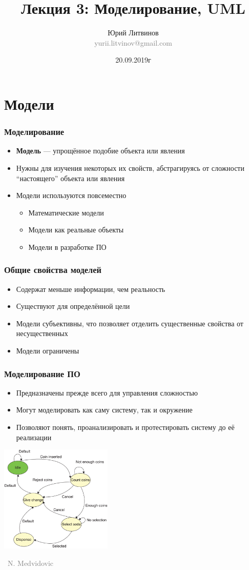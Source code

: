\documentclass[xetex,mathserif,serif]{beamer}
\title[Моделирование]{Лекция 3: Моделирование, UML}
\author[Юрий Литвинов]{Юрий Литвинов\\\small{\textcolor{gray}{yurii.litvinov@gmail.com}}}
\date{20.09.2019г}
\newcommand{\attribution}[1] {
	\vspace{-5mm}\begin{flushright}\begin{scriptsize}\textcolor{gray}{\textcopyright\, #1}\end{scriptsize}\end{flushright}
}
\begin{document}
	\frame{\titlepage}

	\section{Модели}

	\begin{frame}
		\frametitle{Моделирование}
		\begin{itemize}
			\item \textbf{Модель} --- упрощённое подобие объекта или явления
			\item Нужны для изучения некоторых их свойств, абстрагируясь от сложности ``настоящего'' объекта или явления
			\item Модели используются повсеместно
			\begin{itemize}
				\item Математические модели
				\item Модели как реальные объекты
				\item Модели в разработке ПО
			\end{itemize}
		\end{itemize}
	\end{frame}

	\begin{frame}
		\frametitle{Общие свойства моделей}
		\begin{itemize}
			\item Содержат меньше информации, чем реальность
			\item Существуют для определённой цели
			\item Модели субъективны, что позволяет отделить существенные свойства от несущественных
			\item Модели ограничены
		\end{itemize}

	\end{frame}

	\begin{frame}
		\frametitle{Моделирование ПО}
		\begin{itemize}
			\item Предназначены прежде всего для управления сложностью
			\item Могут моделировать как саму систему, так и окружение
			\item Позволяют понять, проанализировать и протестировать систему до её реализации
		\end{itemize}
		\begin{center}
			\includegraphics[width=0.4\textwidth]{vendingMachine.png}
			\attribution{N. Medvidovic}
		\end{center}
	\end{frame}
\end{document}
